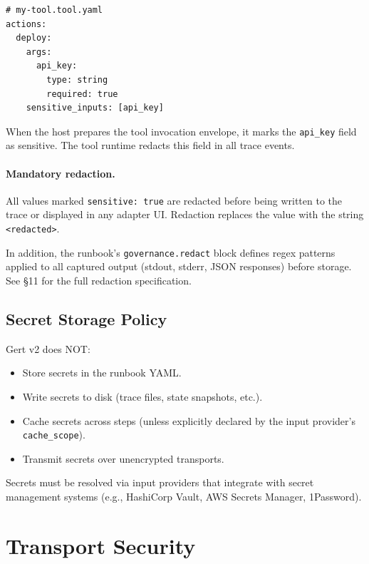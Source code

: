 \begin{verbatim}
# my-tool.tool.yaml
actions:
  deploy:
    args:
      api_key:
        type: string
        required: true
    sensitive_inputs: [api_key]
\end{verbatim}

When the host prepares the tool invocation envelope, it marks the
\texttt{api\_key} field as sensitive.  The tool runtime redacts this field in
all trace events.

\paragraph{Mandatory redaction.}
All values marked \texttt{sensitive: true} are redacted before being written to
the trace or displayed in any adapter UI.  Redaction replaces the value with
the string \texttt{<redacted>}.

In addition, the runbook's \texttt{governance.redact} block defines regex
patterns applied to all captured output (stdout, stderr, JSON responses) before
storage.  See §11 for the full redaction specification.

\subsection{Secret Storage Policy}

Gert v2 does NOT:

\begin{itemize}
  \item Store secrets in the runbook YAML.
  \item Write secrets to disk (trace files, state snapshots, etc.).
  \item Cache secrets across steps (unless explicitly declared by the input
        provider's \texttt{cache\_scope}).
  \item Transmit secrets over unencrypted transports.
\end{itemize}

Secrets must be resolved via input providers that integrate with secret
management systems (e.g., HashiCorp Vault, AWS Secrets Manager, 1Password).

\section{Transport Security}
\label{sec:transport-security}

